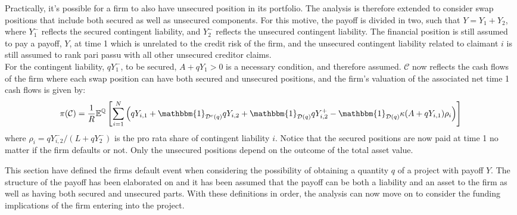 \documentclass[../main.tex]{subfiles}
\begin{document}
        Practically, it's possible for a firm to also have unsecured position in its portfolio.
        The analysis is therefore extended to consider swap positions that include both secured as well as unsecured components.
        For this motive, the payoff is divided in two, such that $Y=Y_1 + Y_2$, where $Y_1^{-}$ reflects the secured contingent liability, and $Y_2^{-}$ reflects the unsecured contingent liability.
        The financial position is still assumed to pay a payoff, $Y$, at time 1 which is unrelated to the credit risk of the firm, and the unsecured contingent liability related to claimant $i$ is still assumed to rank pari passu with all other unsecured creditor claims.\\
        For the contingent liability, $qY_1^{-}$, to be secured, $A+qY_1 > 0$ is a necessary condition, and therefore assumed.
        $\mathcal{C}$ now reflects the cash flows of the firm where each swap position can have both secured and unsecured positions, and the firm's valuation of the associated net time 1 cash flows is given by:
        \begin{equation}
            \pi(\mathcal{C}) = \discountfactor \mathbb{E}^{\mathbb{Q}}\left[
            \sum_{i=1}^{N} \left(
                q Y_{i,1}
                + \mathbbm{1}_{\mathcal{D}^{c}(q)} qY_{i,2}
                + \mathbbm{1}_{\mathcal{D}(q)} qY_{i,2}^{+}
                - \mathbbm{1}_{\mathcal{D}(q)} \kappa (A + qY_{i,1}) \rho_{i}
            \right)\right]
        \end{equation}
        where $\rho_{i} = qY_{i,2}^{-}/(L + qY_{2}^{-})$ is the pro rata share of contingent liability $i$. Notice that the secured positions are now paid at time 1 no matter if the firm defaults or not. Only the unsecured positions depend on the outcome of the total asset value.

        This section have defined the firms default event when considering the possibility
        of obtaining a quantity $q$ of a project with payoff $Y$.
        The structure of the payoff has been elaborated on
        and it has been assumed that the payoff can be both a liability and an asset to the firm
        as well as having both secured and unsecured parts.
        With these definitions in order, the analysis can now move on to consider the
        funding implications of the firm entering into the project.
        
\end{document}
